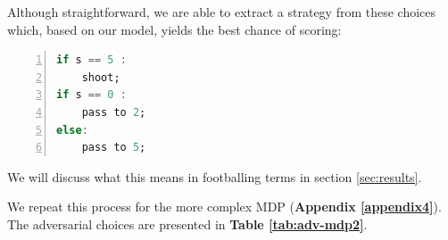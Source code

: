 \documentclass{l4proj}
\begin{document}
Although straightforward, we are able to extract a strategy from these choices which, based on our model, yields the best chance of scoring:

\clearpage
\begin{lstlisting}[language=Haskell, numbers=left, caption=Strategy with optimal probability of goal generated by PRISM from our initial MDP.] 
if s == 5 :
    shoot;
if s == 0 :
    pass to 2;
else:
    pass to 5;
\end{lstlisting}

We will discuss what this means in footballing terms in section \ref{sec:results}.

We repeat this process for the more complex MDP (\textbf{Appendix \ref{appendix4}}). The adversarial choices are presented in \textbf{Table \ref{tab:adv-mdp2}}. 
\end{document}
